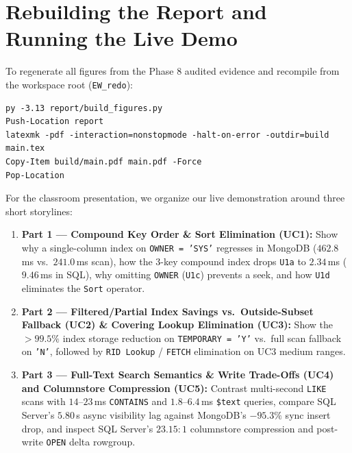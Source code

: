 \section{Rebuilding the Report and Running the Live Demo}
To regenerate all figures from the Phase 8 audited evidence and recompile  from the workspace root (\texttt{EW\_redo}):
\begin{verbatim}
py -3.13 report/build_figures.py
Push-Location report
latexmk -pdf -interaction=nonstopmode -halt-on-error -outdir=build main.tex
Copy-Item build/main.pdf main.pdf -Force
Pop-Location
\end{verbatim}

For the classroom presentation, we organize our live demonstration around three short storylines:
\begin{enumerate}
\item \textbf{Part 1 --- Compound Key Order \& Sort Elimination (UC1):} Show why a single-column index on \texttt{OWNER = 'SYS'} regresses in MongoDB ($462.8$\,ms vs.\ $241.0$\,ms scan), how the 3-key compound index drops \texttt{U1a} to $2.34$\,ms ($9.46$\,ms in SQL), why omitting \texttt{OWNER} (\texttt{U1c}) prevents a seek, and how \texttt{U1d} eliminates the \texttt{Sort} operator.
\item \textbf{Part 2 --- Filtered/Partial Index Savings vs.\ Outside-Subset Fallback (UC2) \& Covering Lookup Elimination (UC3):} Show the $>99.5\%$ index storage reduction on \texttt{TEMPORARY = 'Y'} vs.\ full scan fallback on \texttt{'N'}, followed by \texttt{RID Lookup} / \texttt{FETCH} elimination on UC3 medium ranges.
\item \textbf{Part 3 --- Full-Text Search Semantics \& Write Trade-Offs (UC4) and Columnstore Compression (UC5):} Contrast multi-second \texttt{LIKE} scans with $14$--$23$\,ms \texttt{CONTAINS} and $1.8$--$6.4$\,ms \texttt{\$text} queries, compare SQL Server's $5.80$\,s async visibility lag against MongoDB's $-95.3\%$ sync insert drop, and inspect SQL Server's $23.15:1$ columnstore compression and post-write \texttt{OPEN} delta rowgroup.
\end{enumerate}
